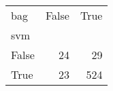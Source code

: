 \begin{tabular}{lrr}
\toprule
bag &  False &  True  \\
svm   &        &        \\
\midrule
False &     24 &     29 \\
True  &     23 &    524 \\
\bottomrule
\end{tabular}
